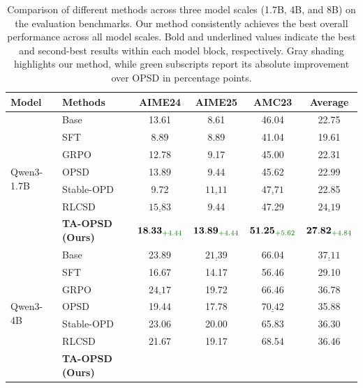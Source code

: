 \documentclass{article} %
\newcommand{\name}[0]{TA-OPSD}
\begin{document}
\begin{table}[t]
\centering
\caption{Comparison of different methods across three model scales (1.7B, 4B, and 8B) on the evaluation benchmarks. Our method consistently achieves the best overall performance across all model scales. Bold and underlined values indicate the best and second-best results within each model block, respectively. Gray shading highlights our method, while green subscripts report its absolute improvement over OPSD in percentage points.}
\label{tab:main-accuracy}
\renewcommand{\arraystretch}{1.0}
\begin{tabular}{llcccc}
\toprule
\textbf{Model} & \textbf{Methods} & \textbf{AIME24} & \textbf{AIME25} & \textbf{AMC23} & \textbf{Average} \\
\midrule
\multirow[c]{7}{*}{Qwen3-1.7B}
 & Base       & 13.61 & 8.61  & 46.04 & 22.75 \\
 & SFT        & 8.89  & 8.89  & 41.04 & 19.61 \\
 & GRPO       & 12.78 & 9.17  & 45.00 & 22.31 \\
 & OPSD       & 13.89 & 9.44  & 45.62 & 22.99 \\
 & Stable-OPD & 9.72  & $\underline{11.11}$
                & $\underline{47.71}$ & 22.85 \\
 & RLCSD      & $\underline{15.83}$ & 9.44
                & 47.29 & $\underline{24.19}$ \\
 & \cellcolor{black!8}\textbf{\name{} (Ours)}
 & \cellcolor{black!8}
   $\mathbf{18.33}_{\color{green!45!black}{+4.44}}$
 & \cellcolor{black!8}
   $\mathbf{13.89}_{\color{green!45!black}{+4.44}}$
 & \cellcolor{black!8}
   $\mathbf{51.25}_{\color{green!45!black}{+5.62}}$
 & \cellcolor{black!8}
   $\mathbf{27.82}_{\color{green!45!black}{+4.84}}$ \\
\midrule
\multirow[c]{7}{*}{Qwen3-4B}
 & Base       & 23.89 & $\underline{21.39}$
                & 66.04 & $\underline{37.11}$ \\
 & SFT        & 16.67 & 14.17 & 56.46 & 29.10 \\
 & GRPO       & $\underline{24.17}$ & 19.72
                & 66.46 & 36.78 \\
 & OPSD       & 19.44 & 17.78
                & $\underline{70.42}$ & 35.88 \\
 & Stable-OPD & 23.06 & 20.00 & 65.83 & 36.30 \\
 & RLCSD      & 21.67 & 19.17 & 68.54 & 36.46 \\
 & \cellcolor{black!8}\textbf{\name{} (Ours)}
 & \cellcolor{black!8}

\end{tabular}
\end{table}
\end{document}
